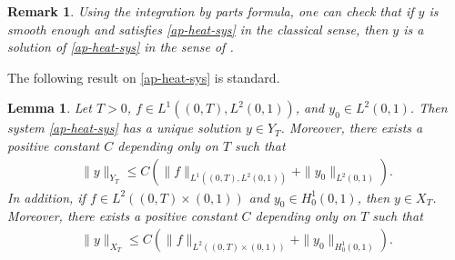 \documentclass[11pt, reqno]{amsart}
\theoremstyle{plain}
\newtheorem{lemma}[thm]{Lemma}
\newtheorem{remark}{Remark}
\numberwithin{equation}{section}
\begin{document}
\begin{remark}	\label{rem-strongsol=>weaksol} \rm
Using the integration by parts formula, one can check that if $y$ is smooth enough and satisfies \eqref{ap-heat-sys} in the classical sense, then $y$ is a solution of \eqref{ap-heat-sys} in the sense of  . 
\end{remark}



\medskip 
The following result on \eqref{ap-heat-sys} is standard.  

\begin{lemma}\label{ap-heat-fx}
Let $T > 0$, $f  \in L^1((0, T), L^2(0, 1))$, and $y_0 \in L^2(0, 1)$. Then  system \eqref{ap-heat-sys} has a unique solution $y \in Y_T$. Moreover, there exists a positive constant $C$ depending only on $T$ such that
\begin{align}	\label{ap-heat-fx-L2Linfty}
\|y\|_{Y_T} \leq C \left(\|f\|_{L^1((0, T), L^2(0, 1))} + \|y_0\|_{L^2(0, 1)} \right).
\end{align}
In addition, if $f \in L^2((0, T) \times (0, 1))$ and $y_0 \in H^1_0(0, 1)$, then $y \in X_T$. Moreover, there exists a positive constant $C$ depending only on $T$ such that
\begin{align}	\label{ap-heat-fx-XT}
	\|y\|_{X_T} \leq C \left(\|f\|_{L^2((0, T) \times (0, 1))} + \|y_0\|_{H^1_0(0, 1)} \right).
\end{align}
\end{lemma}
\end{document}
